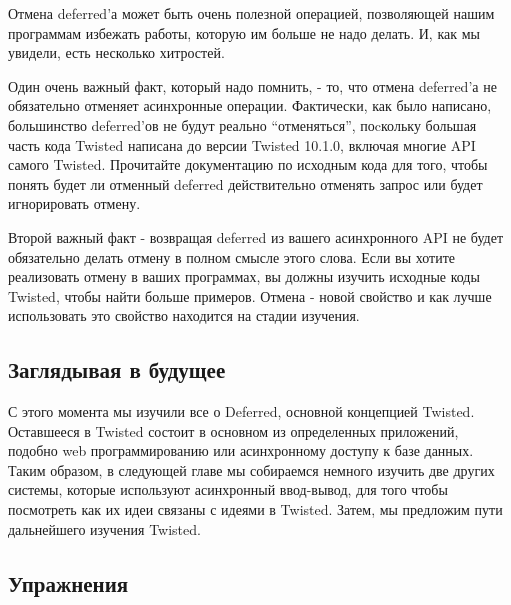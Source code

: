 Отмена deferred'а может быть очень полезной операцией, позволяющей 
нашим программам избежать работы, которую им больше не надо 
делать. И, как мы увидели, есть несколько хитростей.


Один очень важный факт, который надо помнить, - то, что 
отмена deferred'а не обязательно отменяет асинхронные 
операции. Фактически, как было написано, большинство 
deferred'ов не будут реально ``отменяться'', поcкольку 
большая часть кода Twisted написана до версии  Twisted 10.1.0, 
включая многие API самого Twisted. Прочитайте документацию 
по исходным кода для того, чтобы понять будет ли отменный 
deferred действительно отменять запрос или будет игнорировать 
отмену.


Второй важный факт - возвращая deferred из 
вашего асинхронного API не будет обязательно 
делать отмену в полном смысле этого слова. Если вы 
хотите реализовать отмену в ваших программах, 
вы должны изучить исходные коды Twisted, чтобы найти 
больше примеров. Отмена - новой свойство и как лучше 
использовать это свойство находится на стадии изучения.


\subsection{Заглядывая в будущее}

С этого момента мы изучили все о Deferred, 
основной концепцией Twisted. Оставшееся в Twisted 
состоит в основном из определенных приложений, подобно 
web программированию или асинхронному доступу к базе 
данных. Таким образом, в следующей главе мы собираемся 
немного изучить две других системы, которые используют 
асинхронный ввод-вывод, для того чтобы посмотреть как 
их идеи связаны с идеями в Twisted. Затем, мы предложим пути 
дальнейшего изучения Twisted.


\subsection{Упражнения}

